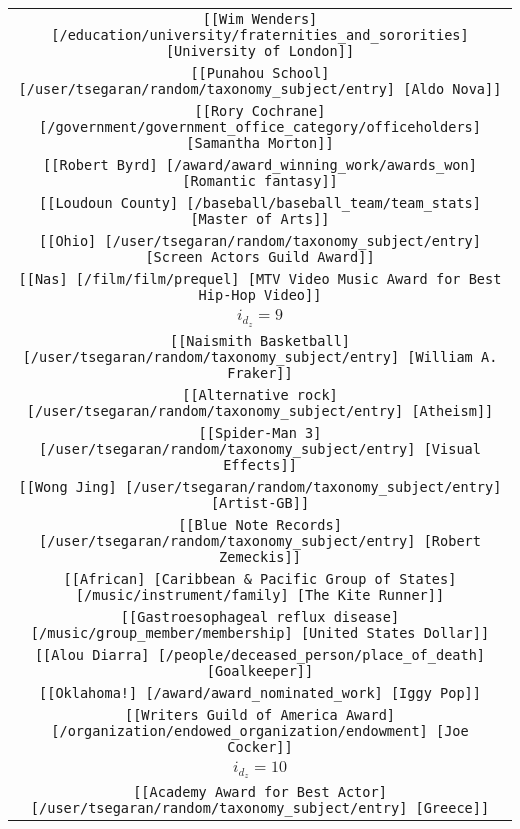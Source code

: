 \begin{longtable}{|c|}
    \texttt{[[Wim Wenders] [/education/university/fraternities\_and\_sororities] [University of London]]}\\
    \texttt{[[Punahou School] [/user/tsegaran/random/taxonomy\_subject/entry] [Aldo Nova]]}\\
    \texttt{[[Rory Cochrane] [/government/government\_office\_category/officeholders] [Samantha Morton]]}\\
    \texttt{[[Robert Byrd] [/award/award\_winning\_work/awards\_won] [Romantic fantasy]]}\\
    \texttt{[[Loudoun County] [/baseball/baseball\_team/team\_stats] [Master of Arts]]}\\
    \texttt{[[Ohio] [/user/tsegaran/random/taxonomy\_subject/entry] [Screen Actors Guild Award]]}\\
    \texttt{[[Nas] [/film/film/prequel] [MTV Video Music Award for Best Hip-Hop Video]]}\\
    \hline 
    \rowcolor[HTML]{EFEFEF} 
    \textsc{$i_{d_z}=9$}\\ \hline 
    \texttt{[[Naismith Basketball] [/user/tsegaran/random/taxonomy\_subject/entry] [William A. Fraker]]}\\
    \texttt{[[Alternative rock] [/user/tsegaran/random/taxonomy\_subject/entry] [Atheism]]}\\
    \texttt{[[Spider-Man 3] [/user/tsegaran/random/taxonomy\_subject/entry] [Visual Effects]]}\\
    \texttt{[[Wong Jing] [/user/tsegaran/random/taxonomy\_subject/entry] [Artist-GB]]}\\
    \texttt{[[Blue Note Records] [/user/tsegaran/random/taxonomy\_subject/entry] [Robert Zemeckis]]}\\
    \texttt{[[African] [Caribbean \& Pacific Group of States] [/music/instrument/family] [The Kite Runner]]}\\
    \texttt{[[Gastroesophageal reflux disease] [/music/group\_member/membership] [United States Dollar]]}\\
    \texttt{[[Alou Diarra] [/people/deceased\_person/place\_of\_death] [Goalkeeper]]}\\
    \texttt{[[Oklahoma!] [/award/award\_nominated\_work] [Iggy Pop]]}\\
    \texttt{[[Writers Guild of America Award] [/organization/endowed\_organization/endowment] [Joe Cocker]]}\\
    \hline 
    \rowcolor[HTML]{EFEFEF} 
    \textsc{$i_{d_z}=10$}\\ \hline 
    \texttt{[[Academy Award for Best Actor] [/user/tsegaran/random/taxonomy\_subject/entry] [Greece]]}\\

\end{longtable}
